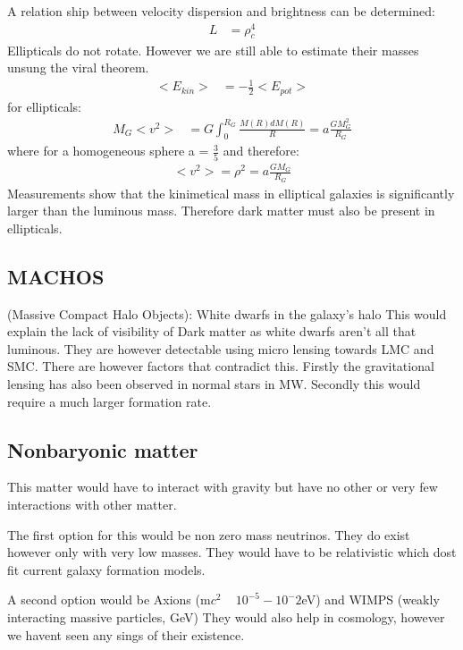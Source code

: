 \documentclass[11pt,a4paper]{article}
\begin{document}
A relation ship between velocity dispersion and brightness can be determined: 
\begin{align*}
    L &= \rho_c^4 
\end{align*}
Ellipticals do not rotate. 
However we are still able to estimate their masses unsung the viral theorem. 
\begin{align*}
    <E_{kin}> &= - \frac 1 2 <E_{pot}> 
\end{align*}
for ellipticals:
\begin{align*}
    M_G<v^2> &= G \int_0^{R_G} \frac {M(R)dM(R)} R = a \frac {GM^2_G}{R_G} 
\end{align*}
where for a homogeneous sphere a = $\frac 3 5$ and therefore:
\begin{align*}
    <v^2> = \rho^2  = a \frac{GM_G}{R_G} 
\end{align*}
Measurements show that the kinimetical mass in elliptical galaxies is significantly larger than the luminous mass.
Therefore dark matter must also be present in ellipticals. 
\subsection{MACHOS}
(Massive Compact Halo Objects): White dwarfs in the galaxy’s halo
This would explain the lack of visibility of Dark matter as white dwarfs aren't all that luminous. 
They are however detectable using micro lensing towards LMC and SMC. 
There are however factors that contradict this. 
Firstly the gravitational lensing has also been observed in normal stars in MW.
Secondly this would require a much larger formation rate. 
\subsection{Nonbaryonic matter}
This matter would have to interact with gravity but have no other or very few interactions with other matter. 

The first option for this would be non zero mass neutrinos. They do exist however only with very low masses.
They would have to be relativistic which dost fit current galaxy formation models.

A second option would be Axions (m$c^2$ ~ $10^{-5}-10^-{2}$eV) and WIMPS (weakly interacting massive
particles, GeV)
They would also help in cosmology, however we havent seen any sings of their existence. 
\end{document}
